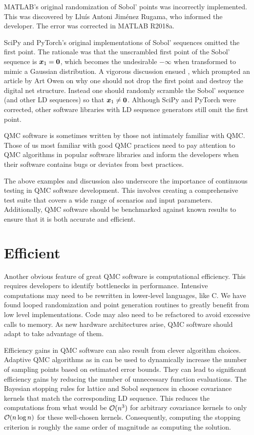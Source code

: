 \documentclass[graybox]{svmult}
\begin{document}
MATLAB's original randomization of Sobol' points was incorrectly implemented.  This was discovered by Llu\'is Antoni Jim\'enez Rugama, who informed the developer.  The error was corrected in MATLAB R2018a.

SciPy and PyTorch's original implementations of Sobol' sequences omitted the first point.  The rationale was that the unscrambled first point of the Sobol' sequence is ${\boldsymbol{x}}_1 = {\boldsymbol{0}}$, which becomes the undesirable $\boldsymbol{-\infty}$ when transformed to mimic a Gaussian distribution.  A vigorous discussion ensued \cite{scipySobol2020a,pytorchSoboldiscussion2020a}, which prompted an article by Art Owen \cite{Owe22a} on why one should not drop the first point and destroy the digital net structure.  Instead one should randomly scramble the Sobol' sequence (and other LD sequences) so that ${\boldsymbol{x}}_1 \ne {\boldsymbol{0}}$.  Although SciPy and PyTorch were corrected, other software libraries with LD sequence generators still omit the first point.

QMC software is sometimes written by those not intimately familiar with QMC.  Those of us most familiar with good QMC practices need to pay attention to QMC algorithms in popular software libraries and inform the developers when their software contains bugs or deviates from best practices.

The above examples and discussion also underscore the importance of continuous testing in QMC software development. This involves creating a comprehensive test suite that covers a wide range of scenarios and input parameters. Additionally, QMC software should be benchmarked against known results to ensure that it is both accurate and efficient.


\section{Efficient} \label{CDHJS_sec:efficient}
Another obvious feature of great QMC software is computational efficiency.  This requires developers to identify bottlenecks in performance. Intensive computations may need to be rewritten in lower-level languages, like C. We have found looped randomization and point generation routines to greatly benefit from low level implementations. Code may also need to be refactored to avoid excessive calls to memory.  As new hardware architectures arise, QMC software should adapt to take advantage of them.

Efficiency gains in QMC software can also result from clever algorithm choices. Adaptive QMC algorithms as in \cite{JimHic16a, HicJim16a, HicEtal17a, RatHic19a,JagHic22a} can be used to dynamically increase the number of sampling points based on estimated error bounds. They can lead to significant efficiency gains by reducing the number of unnecessary function evaluations. The Bayesian stopping rules for lattice and Sobol sequences in \cite{RatHic19a,JagHic22a} choose covariance kernels that match the corresponding LD sequence.  This reduces the computations from what would be ${\mathcal{O}}(n^3)$ for arbitrary covariance kernels to only ${\mathcal{O}}(n \log n)$ for these well-chosen kernels. Consequently, computing the stopping criterion is roughly the same order of magnitude as computing the solution.
\end{document}
